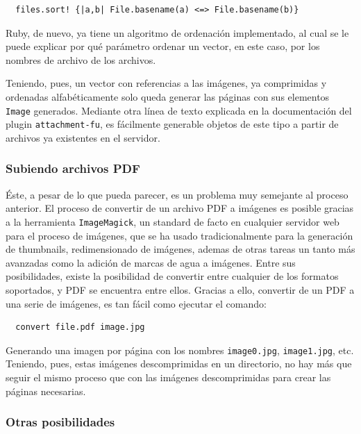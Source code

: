 \begin{verbatim}
  files.sort! {|a,b| File.basename(a) <=> File.basename(b)}
\end{verbatim}

Ruby, de nuevo, ya tiene un algoritmo de ordenación implementado, al cual se le puede explicar por qué parámetro ordenar un vector, en este caso, por los nombres de archivo de los archivos.

Teniendo, pues, un vector con referencias a las imágenes, ya comprimidas y ordenadas alfabéticamente solo queda generar las páginas con sus elementos \texttt{Image} generados. Mediante otra línea de texto explicada en la documentación del plugin \texttt{attachment-fu}, es fácilmente generable objetos de este tipo a partir de archivos ya existentes en el servidor.


\subsubsection{Subiendo archivos PDF} %
\label{ssub:subiendo_archivos_pdf}

Éste, a pesar de lo que pueda parecer, es un problema muy semejante al proceso anterior. El proceso de convertir de un archivo PDF a imágenes es posible gracias a la herramienta \texttt{ImageMagick}, un standard de facto en cualquier servidor web para el proceso de imágenes, que se ha usado tradicionalmente para la generación de thumbnails, redimensionado de imágenes, ademas de otras tareas un tanto más avanzadas como la adición de marcas de agua a imágenes. Entre sus posibilidades, existe la posibilidad de convertir entre cualquier de los formatos soportados, y PDF se encuentra entre ellos. Gracias a ello, convertir de un PDF a una serie de imágenes, es tan fácil como ejecutar el comando:

\begin{verbatim}
  convert file.pdf image.jpg
\end{verbatim}

Generando una imagen por página con los nombres \texttt{image0.jpg}, \texttt{image1.jpg}, etc. Teniendo, pues, estas imágenes descomprimidas en un directorio, no hay más que seguir el mismo proceso que con las imágenes descomprimidas para crear las páginas necesarias.


\subsubsection{Otras posibilidades} %
\label{ssub:otras_posibilidades}

